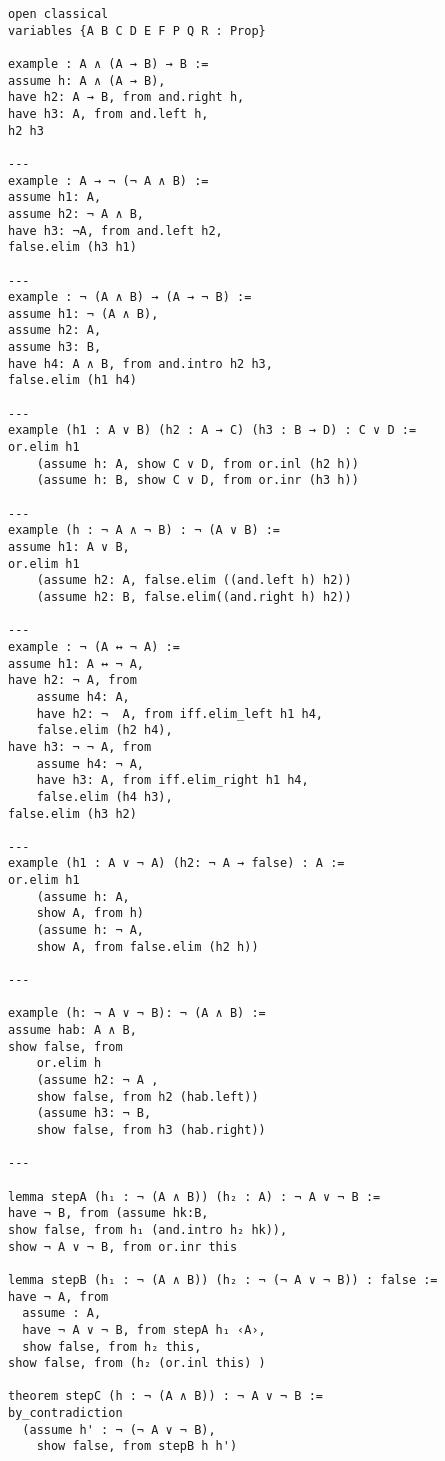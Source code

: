 \begin{lstlisting}
open classical
variables {A B C D E F P Q R : Prop}

example : A ∧ (A → B) → B :=
assume h: A ∧ (A → B),
have h2: A → B, from and.right h,
have h3: A, from and.left h,
h2 h3

---
example : A → ¬ (¬ A ∧ B) :=
assume h1: A,
assume h2: ¬ A ∧ B,
have h3: ¬A, from and.left h2,
false.elim (h3 h1)

---
example : ¬ (A ∧ B) → (A → ¬ B) :=
assume h1: ¬ (A ∧ B),
assume h2: A,
assume h3: B,
have h4: A ∧ B, from and.intro h2 h3,
false.elim (h1 h4)

---
example (h1 : A ∨ B) (h2 : A → C) (h3 : B → D) : C ∨ D :=
or.elim h1
    (assume h: A, show C ∨ D, from or.inl (h2 h))
    (assume h: B, show C ∨ D, from or.inr (h3 h))

---
example (h : ¬ A ∧ ¬ B) : ¬ (A ∨ B) :=
assume h1: A ∨ B,
or.elim h1
    (assume h2: A, false.elim ((and.left h) h2))
    (assume h2: B, false.elim((and.right h) h2))

---
example : ¬ (A ↔ ¬ A) :=
assume h1: A ↔ ¬ A,
have h2: ¬ A, from
	assume h4: A, 
	have h2: ¬  A, from iff.elim_left h1 h4,
	false.elim (h2 h4),
have h3: ¬ ¬ A, from 
	assume h4: ¬ A,
	have h3: A, from iff.elim_right h1 h4,
	false.elim (h4 h3),
false.elim (h3 h2)

---
example (h1 : A ∨ ¬ A) (h2: ¬ A → false) : A := 
or.elim h1
    (assume h: A, 
    show A, from h)
    (assume h: ¬ A, 
    show A, from false.elim (h2 h))

---

example (h: ¬ A ∨ ¬ B): ¬ (A ∧ B) :=
assume hab: A ∧ B,
show false, from
    or.elim h
    (assume h2: ¬ A ,
    show false, from h2 (hab.left))
    (assume h3: ¬ B,
    show false, from h3 (hab.right))

---

lemma stepA (h₁ : ¬ (A ∧ B)) (h₂ : A) : ¬ A ∨ ¬ B :=
have ¬ B, from (assume hk:B,
show false, from h₁ (and.intro h₂ hk)),
show ¬ A ∨ ¬ B, from or.inr this

lemma stepB (h₁ : ¬ (A ∧ B)) (h₂ : ¬ (¬ A ∨ ¬ B)) : false :=
have ¬ A, from
  assume : A,
  have ¬ A ∨ ¬ B, from stepA h₁ ‹A›,
  show false, from h₂ this,
show false, from (h₂ (or.inl this) )

theorem stepC (h : ¬ (A ∧ B)) : ¬ A ∨ ¬ B :=
by_contradiction
  (assume h' : ¬ (¬ A ∨ ¬ B),
    show false, from stepB h h')



\end{lstlisting}
